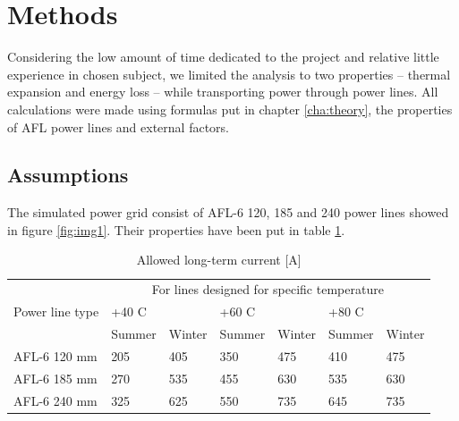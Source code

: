 \documentclass[a4paper]{article}
\begin{document}
%
\section{Methods}
\label{cha:methods}

Considering the low amount of time dedicated to the project and relative little experience in chosen subject, we limited the analysis to two properties -- thermal expansion and energy loss -- while transporting power through power lines. All calculations were made using formulas put in chapter \ref{cha:theory}, the properties of AFL power lines and external factors.

\subsection{Assumptions}
\label{sec:assumptions}

The simulated power grid consist of AFL-6 120, 185  and 240 power lines showed in figure \ref{fig:img1}. Their properties have been put in table \ref{tab:aflProperties}.

\begin{table}[!h]
\centering
\caption{Allowed long-term current {[}A{]}}
\label{tab:aflProperties}
\begin{tabular}{|l|l|l|l|l|l|l|}
\hline
\multicolumn{1}{|c|}{\multirow{3}{*}{Power line type}} & \multicolumn{6}{c|}{For lines designed for specific temperature}                     \\ \cline{2-7} 
\multicolumn{1}{|c|}{}                                & \multicolumn{2}{l|}{+40 C} & \multicolumn{2}{l|}{+60 C} & \multicolumn{2}{l|}{+80 C} \\ \cline{2-7} 
\multicolumn{1}{|c|}{}                                & Summer       & Winter      & Summer       & Winter      & Summer       & Winter      \\ \hline
AFL-6 120 mm                                          & 205          & 405         & 350          & 475         & 410          & 475         \\ \hline
AFL-6 185 mm                                          & 270          & 535         & 455          & 630         & 535          & 630         \\ \hline
AFL-6 240 mm                                          & 325          & 625         & 550          & 735         & 645          & 735         \\ \hline
\end{tabular}
\end{table}
\end{document}
